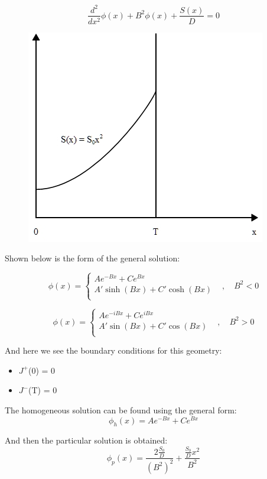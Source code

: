 \documentclass{amsart}
\theoremstyle{definition}
\begin{document}
\begin{equation*}
    \frac{d^2}{dx^2}\phi(x) + B^2\phi(x) + \frac{S(x)}{D} = 0
\end{equation*}
 
\begin{figure}[h!]
    \includegraphics[width=.45\linewidth]{P1a}
\end{figure}
\bigbreak


Shown below is the form of the general solution:
\bigbreak

\[   \phi(x) = \left\{
\begin{array}{ll}
      Ae^{-Bx} + Ce^{Bx} &  \\
      A'\sinh(Bx) + C'\cosh(Bx) &  \\
\end{array}
\right. , \quad B^2 < 0\]
\bigbreak

\[   \phi(x) = \left\{
\begin{array}{ll}
      Ae^{-iBx} + Ce^{iBx} &  \\
      A'\sin(Bx) + C'\cos(Bx) &  \\
\end{array}
\right. , \quad B^2 > 0\]
\bigbreak


And here we see the boundary conditions for this geometry:
\begin{itemize}
    \item $J^+$(0) = 0
    \item $J^-$(T) = 0
\end{itemize}
\bigbreak


The homogeneous solution can be found using the general form:
\begin{equation*}
    \phi_h(x) = Ae^{-Bx} + Ce^{Bx}
\end{equation*}


And then the particular solution is obtained:
\begin{equation*}
    \phi_p(x) = \frac{2\frac{S_0}{D}}{(B^2)^2} + \frac{\frac{S_0}{D}x^2}{B^2}
\end{equation*}
\end{document}
